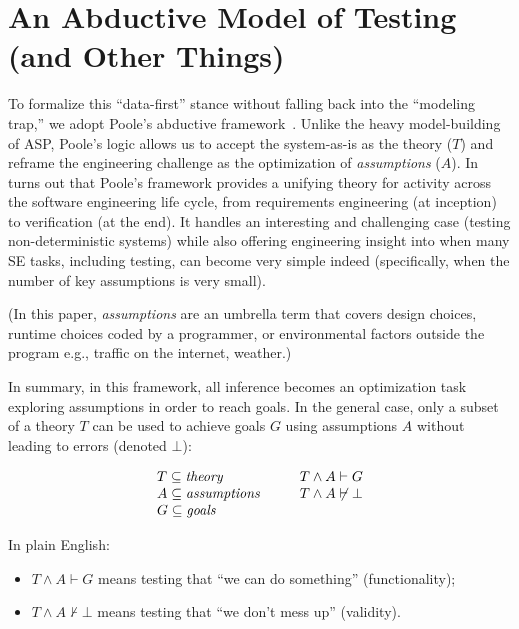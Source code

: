 \documentclass[pdflatex,sn-basic]{sn-jnl}
\begin{document}
\section{An Abductive Model of Testing (and Other Things)}

To formalize this ``data-first'' stance without falling back into
the ``modeling trap,'' we adopt Poole's abductive
framework~\citep{Poole1994WhoCT}. Unlike the heavy model-building of ASP,
Poole's logic allows us to accept the system-as-is as the theory ($T$)
and reframe the engineering challenge as the optimization of
\textit{assumptions} ($A$).
In turns out that Poole's framework provides
a unifying theory for activity across the  software engineering life cycle, from
requirements engineering (at inception) to verification (at the end). It handles an interesting and challenging case (testing non-deterministic systems) while also offering engineering insight into when many SE tasks, including testing, can become very simple indeed (specifically, when the number of key assumptions is very small).



(In this paper, \textit{assumptions} are an umbrella term that covers design choices, runtime choices coded by a programmer, or environmental factors  outside the program e.g., traffic on the internet, weather.)

In summary, in this framework, all inference becomes an optimization task exploring assumptions in order to reach goals.
In the general case, only a subset of a theory $T$ can be used to
achieve goals $G$ using assumptions $A$ without leading to errors
(denoted $\bot$):

\begin{equation}\label{eq:subs}
\begin{array}{l@{\hspace{1cm}}l}
 T  \subseteq \mathit{theory}       & T \wedge A  \vdash  G        \\
 A \subseteq \mathit{assumptions}  & T \wedge A  \not\vdash \bot \\
 G \subseteq \mathit{goals}        &
\end{array}
\end{equation}

\noindent In plain English:
\begin{itemize}
    \item $ T \wedge A \vdash G$ means testing that ``we can do
    something'' (functionality);
    \item $T \wedge A \not\vdash \bot$ means testing that ``we don't
    mess up'' (validity).
\end{itemize}
 
\end{document}
